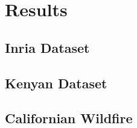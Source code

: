 \chapter{Results}

\section{Inria Dataset}

\section{Kenyan Dataset}

\section{Californian Wildfire}



